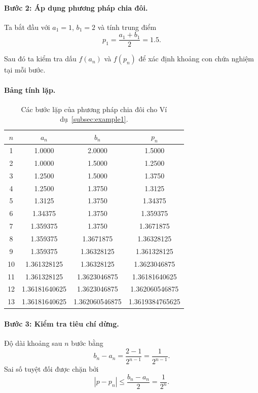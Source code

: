 \paragraph*{Bước 2: Áp dụng phương pháp chia đôi.}
Ta bắt đầu với $a_1 = 1$, $b_1 = 2$ và tính trung điểm
\[
p_1 = \frac{a_1 + b_1}{2} = 1.5.
\]

Sau đó ta kiểm tra dấu $f(a_n)$ và $f(p_n)$
để xác định khoảng con chứa nghiệm tại mỗi bước.

\paragraph*{Bảng tính lặp.}

\begin{table}[!h]
\centering
\caption{Các bước lặp của phương pháp chia đôi cho Ví dụ~\ref{subsec:example1}.}
\label{tab:example1-bisection}
\begin{tabular}{cccc}
\toprule
$n$ & $a_n$ & $b_n$ & $p_n$ \\
\midrule
1  & 1.0000       & 2.0000       & 1.5000 \\
2  & 1.0000       & 1.5000       & 1.2500 \\
3  & 1.2500       & 1.5000       & 1.3750 \\
4  & 1.2500       & 1.3750       & 1.3125 \\
5  & 1.3125       & 1.3750       & 1.34375 \\
6  & 1.34375      & 1.3750       & 1.359375 \\
7  & 1.359375     & 1.3750       & 1.3671875 \\
8  & 1.359375     & 1.3671875    & 1.36328125 \\
9  & 1.359375     & 1.36328125   & 1.361328125 \\
10 & 1.361328125  & 1.36328125   & 1.3623046875 \\
11 & 1.361328125  & 1.3623046875 & 1.36181640625 \\
12 & 1.36181640625 & 1.3623046875 & 1.362060546875 \\
13 & 1.36181640625 & 1.362060546875 & 1.3619384765625 \\
\bottomrule
\end{tabular}
\end{table}

\paragraph*{Bước 3: Kiểm tra tiêu chí dừng.}
Độ dài khoảng sau $n$ bước bằng
\[
b_n - a_n = \frac{2 - 1}{2^{n-1}} = \frac{1}{2^{n-1}}.
\]
Sai số tuyệt đối được chặn bởi
\[
|p - p_n| \le \frac{b_n - a_n}{2} = \frac{1}{2^n}.
\]

